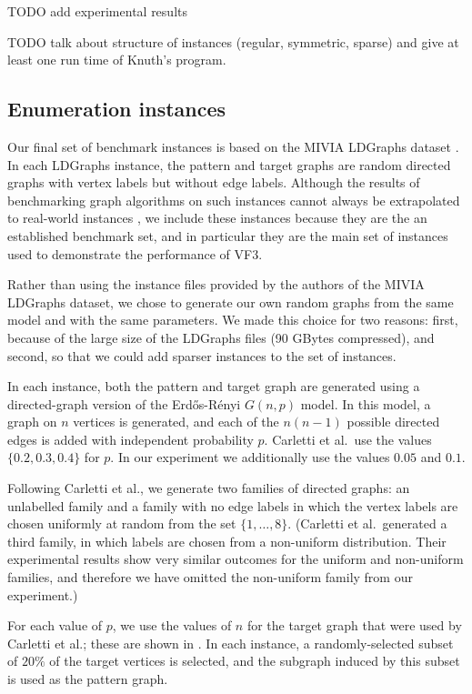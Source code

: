 TODO add experimental results

TODO talk about structure of instances (regular, symmetric, sparse) and give at least one run
time of Knuth's program.

\FloatBarrier

\subsection{Enumeration instances}

Our final set of benchmark instances is based on the MIVIA LDGraphs dataset
\cite{DBLP:journals/pami/CarlettiFSV18}.  In each LDGraphs instance, the pattern and
target graphs are random directed graphs with vertex labels but without edge labels.
Although the results of benchmarking graph algorithms on such instances cannot
always be extrapolated to real-world instances \cite{DBLP:conf/cp/McCreeshPST17},
we include these instances because they are the an established benchmark set,
and in particular they are the main set of instances used to demonstrate the
performance of VF3.

Rather than using the instance files provided by the authors of the MIVIA LDGraphs
dataset, we chose to generate our own random graphs from the same model and with the
same parameters.  We made this choice for two reasons: first, because of the large size
of the LDGraphs files (90 GBytes compressed), and second, so that we could add sparser
instances to the set of instances.

In each instance, both the pattern and target graph are generated using a directed-graph
version of the Erd\H{o}s-Rényi $G(n,p)$ model.  In this model, a graph on $n$ vertices
is generated, and each of the $n(n-1)$ possible directed edges is added with independent
probability $p$.  Carletti et al.\ use the values $\{0.2, 0.3, 0.4\}$ for $p$. In our experiment
we additionally use the values $0.05$ and $0.1$.

Following Carletti et al., we generate two families of directed graphs: an unlabelled family
and a family with no edge labels in which the vertex labels are chosen uniformly at random
from the set $\{1,\dots,8\}$.  (Carletti et al.\ generated a third family, in which labels
are chosen from a non-uniform distribution.  Their experimental results show very similar
outcomes for the uniform and non-uniform families, and therefore we have omitted the non-uniform
family from our experiment.)

For each value of $p$, we use the values
of $n$ for the target graph that were used by Carletti et al.; these are shown in .
In each instance, a randomly-selected subset of $20\%$ of the target vertices is selected,
and the subgraph induced by this subset is used as the pattern graph.

